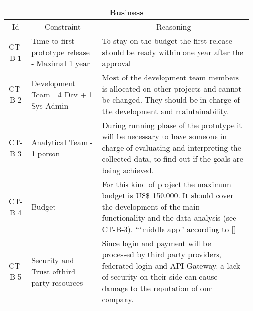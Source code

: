\begin{table}[H]
    \begin{tabularx}{\textwidth}{|c|X|X|}
        \hline
        \multicolumn{3}{c}{\textbf{Business}} \\
        \hline
        \toprule
        \multicolumn{1}{c}{Id} & \multicolumn{1}{c}{Constraint} & \multicolumn{1}{c}{Reasoning} \\
        \midrule
        CT-B-1 & Time to first prototype release - Maximal 1 year & To stay on the budget the first release should
        be ready within one year after the approval \\
        CT-B-2 & Development Team - 4 Dev + 1 Sys-Admin & Most of the development team members is allocated on
        other projects and cannot be changed. They should be in charge of the development and maintainability. \\
        CT-B-3 & Analytical Team - 1 person & During running phase of the prototype it will be necessary to have someone 
        in charge of evaluating and interpreting the collected data, to find out if the goals are being achieved. \\
        CT-B-4 & Budget & For this kind of project the maximum budget is US\$ 150.000. It should cover the development of 
        the main functionality and the data analysis (see CT-B-3).  ```middle app'' according to [\cite{refonline:SPDLOAD}] \\
        CT-B-5 & Security and Trust ofthird party resources & Since login and payment will be processed by third party providers,
        \gls{federated login} and \gls{API Gateway}, a lack of security on their side can cause damage to the reputation of 
        our company. \\
        \bottomrule
    \end{tabularx}
\end{table}



